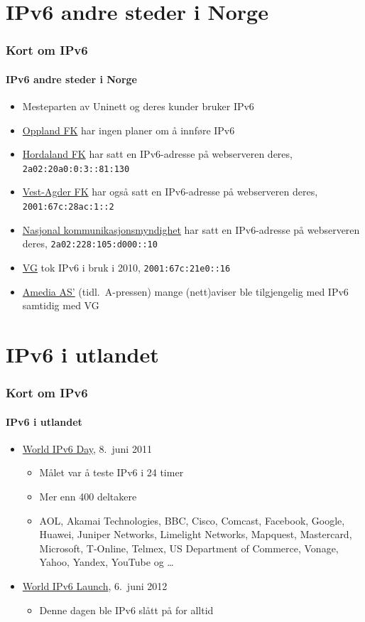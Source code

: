 \section{IPv6 andre steder i Norge}
\begin{frame}%
  \frametitle{Kort om IPv6}
  \framesubtitle{IPv6 andre steder i Norge}
  \pause
  \begin{itemize}[<+->]
  \item Mesteparten av Uninett og deres kunder bruker IPv6
  \item \href{http://www.oppland.no/}{Oppland FK} har ingen
    planer om å innføre IPv6
  \item \href{http://www.hordaland.no/}{Hordaland FK} har satt en
    IPv6-adresse på webserveren deres, \texttt{2a02:20a0:0:3::81:130}
  \item \href{http://www.vaf.no/}{Vest-Agder FK} har også satt en
    IPv6-adresse på webserveren deres, \texttt{2001:67c:28ac:1::2}
  \item \href{http://www.nkom.no/}{Nasjonal kommunikasjonsmyndighet}
    har satt en IPv6-adresse på webserveren deres,
    \texttt{2a02:228:105:d000::10}
  \item \href{http://vg.no/}{VG} tok IPv6 i bruk i 2010,
    \texttt{2001:67c:21e0::16}
  \item \href{http://www.amedia.no/}{Amedia AS'} (tidl.\ A-pressen) mange
    (nett)aviser ble tilgjengelig med IPv6 samtidig med VG
  \end{itemize}
\end{frame}

\section{IPv6 i utlandet}
\begin{frame}%
  \frametitle{Kort om IPv6}
  \framesubtitle{IPv6 i utlandet}
  \pause
  \begin{itemize}[<+->]
  \item
    \href{http://www.internetsociety.org/ipv6/archive-2011-world-ipv6-day/}{World
      IPv6 Day}, 8.\ juni 2011
    \begin{itemize}[<+->]
    \item Målet var å teste IPv6 i 24 timer
    \item Mer enn 400 deltakere
    \item AOL, Akamai Technologies, BBC, Cisco, Comcast, Facebook,
      Google, Huawei, Juniper Networks, Limelight Networks, Mapquest,
      Mastercard, Microsoft, T-Online, Telmex, US Department of
      Commerce, Vonage, Yahoo, Yandex, YouTube og \dots
    \end{itemize}
  \item \href{http://www.worldipv6launch.org/}{World IPv6 Launch},
    6.\ juni 2012
    \begin{itemize}[<+->]
    \item Denne dagen ble IPv6 slått på for alltid
    \end{itemize}
  \end{itemize}
\end{frame}

